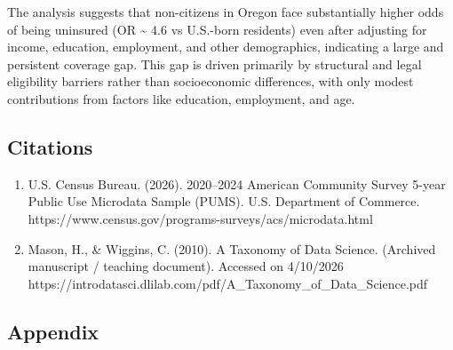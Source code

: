\documentclass[
  letterpaper,
  DIV=11,
  numbers=noendperiod]{scrartcl}
\begin{document}
The analysis suggests that non-citizens in Oregon face substantially
higher odds of being uninsured (OR \textasciitilde{} 4.6 vs U.S.-born
residents) even after adjusting for income, education, employment, and
other demographics, indicating a large and persistent coverage gap. This
gap is driven primarily by structural and legal eligibility barriers
rather than socioeconomic differences, with only modest contributions
from factors like education, employment, and age.

\subsection{Citations}\label{citations}

\begin{enumerate}
\def\labelenumi{\arabic{enumi}.}
\item
  U.S. Census Bureau. (2026). 2020--2024 American Community Survey
  5-year Public Use Microdata Sample (PUMS). U.S. Department of
  Commerce. https://www.census.gov/programs-surveys/acs/microdata.html
\item
  Mason, H., \& Wiggins, C. (2010). A Taxonomy of Data Science.
  (Archived manuscript / teaching document). Accessed on 4/10/2026
  https://introdatasci.dlilab.com/pdf/A\_Taxonomy\_of\_Data\_Science.pdf
\end{enumerate}

\subsection{Appendix}\label{appendix}
\end{document}
